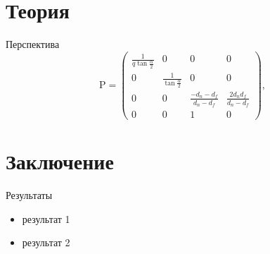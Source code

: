 \documentclass[xetex,12pt,compress,hyperref={xetex}]{beamer}
\begin{document}
 \section{Теория}
 
 \begin{frame}{Перспектива} 
   \begin{equation}
    \mathrm{P} =
    \begin{pmatrix}
     \frac{1}{q\tan{\frac{\alpha}{2}}} & 0 & 0 & 0 \\
     0 & \frac{1}{\tan{\frac{\alpha}{2}}}  & 0 & 0\\
     0 & 0 & \frac{-d_n - d_f}{d_n - d_f} & \frac{2d_n d_f}{d_n - d_f}\\
     0 & 0 & 1 & 0
    \end{pmatrix},
   \end{equation}  
 \end{frame}
 
 \section{Заключение}
  
 \begin{frame}{Результаты}
  \begin{itemize}
    \item результат 1
    \item результат 2
  \end{itemize}
 \end{frame} 
 
\end{document}
